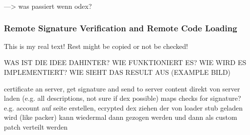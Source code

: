 ---> was passiert wenn odex?

\subsubsection{Remote Signature Verification and Remote Code Loading} \label{subsubsection:counter-tampering-signature-remote}
This is my real text! Rest might be copied or not be checked!



WAS IST DIE IDEE DAHINTER? WIE FUNKTIONIERT ES? WIE WIRD ES IMPLEMENTIERT? WIE SIEHT DAS RESULT AUS (EXAMPLE BILD)\newline

certificate an server, get signature and send to server\newline
content direkt von server laden (e.g. all descriptions, not sure if dex possible)\newline
maps checks for signature?\newline
e.g. account auf seite erstellen, ecrypted dex ziehen der von loader stub geladen wird (like packer)
kann wiedermal dann gezogen werden und dann als custom patch verteilt werden\newline
